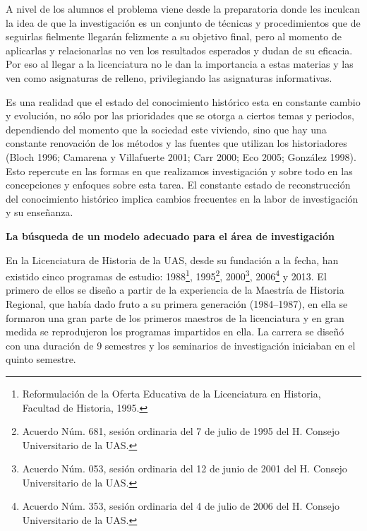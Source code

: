 \begin{Obs}
\item[4.-] A nivel de los alumnos el problema viene desde la preparatoria 
donde les inculcan la idea de que la investigación es un conjunto de 
técnicas y procedimientos que de seguirlas fielmente llegarán 
felizmente a su objetivo final, pero al momento de aplicarlas y 
relacionarlas no ven los resultados esperados y dudan de su eficacia. 
Por eso al llegar a la licenciatura no le dan la importancia a estas 
materias y las ven como asignaturas de relleno, privilegiando las 
asignaturas informativas.

\item[5.-] Es una realidad que el estado del conocimiento histórico esta en 
constante cambio y evolución, no sólo por las prioridades que se otorga 
a ciertos temas y periodos, dependiendo del momento que la sociedad 
este viviendo, sino que hay una constante renovación de los métodos y 
las fuentes que utilizan los historiadores (Bloch 1996; Camarena y 
Villafuerte 2001; Carr 2000; Eco 2005; González 1998). Esto 
repercute en las formas en que realizamos investigación y sobre todo en 
las concepciones y enfoques sobre esta tarea. El constante estado de 
reconstrucción del conocimiento histórico implica cambios frecuentes en 
la labor de investigación y su enseñanza.
\end{Obs}


\smallskip
{\bfseries La búsqueda de un modelo adecuado para el área de 
investigación}
\enlargethispage{1\baselineskip}

En la Licenciatura de Historia de la UAS, desde su fundación a la fecha, 
han existido cinco programas de estudio: 1988\footnote{Reformulación de la Oferta Educativa de la Licenciatura en Historia, Facultad de Historia, 1995.}, 
1995\footnote{Acuerdo Núm\@. 681, sesión ordinaria del 7 de julio de 1995 del H\@. 
Consejo Universitario de la UAS\@.}, 2000\footnote{Acuerdo Núm\@. 053, sesión ordinaria del 12 de junio de 2001 del H\@. Consejo Universitario de la UAS\@.}, 
2006\footnote{Acuerdo Núm\@. 353, sesión ordinaria del 4 de julio de 2006 del H\@. 
Consejo Universitario de la UAS\@.} y 2013. El primero de ellos se diseño a partir 
de la experiencia de la Maestría de Historia Regional, que había dado 
fruto a su primera generación (1984--1987), en ella se formaron una gran 
parte de los primeros maestros de la licenciatura y en gran medida se 
reprodujeron los programas impartidos en ella. La carrera se diseñó con 
una duración de 9 semestres y los seminarios de investigación iniciaban 
en el quinto semestre.

